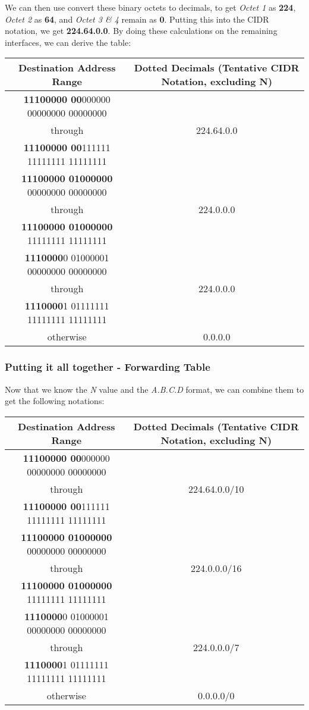 \documentclass[colorlinks=true, allcolors=blue]{article}
\begin{document}
We can then use convert these binary octets to decimals, to get \textit{Octet 1} as \textbf{224}, \textit{Octet 2} as \textbf{64}, and \textit{Octet 3 \& 4} remain as \textbf{0}. Putting this into the CIDR notation, we get \textbf{224.64.0.0}. By doing these calculations on the remaining interfaces, we can derive the table:

\renewcommand{\arraystretch}{1.5}
\begin{center}
\begin{tabular}{|c|c|}
\hline
\textbf{Destination Address Range} & \textbf{Dotted Decimals (Tentative CIDR Notation, excluding N)} \\
\hline
\textbf{11100000 00}000000 00000000 00000000 & \\
through & 224.64.0.0 \\
\textbf{11100000 00}111111 11111111 11111111 & \\
\hline
\textbf{11100000 01000000} 00000000 00000000 & \\
through & 224.0.0.0 \\
\textbf{11100000 01000000} 11111111 11111111 & \\
\hline
\textbf{1110000}0 01000001 00000000 00000000 & \\
through & 224.0.0.0 \\
\textbf{1110000}1 01111111 11111111 11111111 & \\
\hline
otherwise & 0.0.0.0 \\
\hline  
\end{tabular}
\end{center}

\subsubsection{Putting it all together - Forwarding Table}

Now that we know the \textit{N} value and the \textit{A.B.C.D} format, we can combine them to get the following notations:

\renewcommand{\arraystretch}{1.5}
\begin{center}
\begin{tabular}{|c|c|}
\hline
\textbf{Destination Address Range} & \textbf{Dotted Decimals (Tentative CIDR Notation, excluding N)} \\
\hline
\textbf{11100000 00}000000 00000000 00000000 & \\
through & 224.64.0.0/10 \\
\textbf{11100000 00}111111 11111111 11111111 & \\
\hline
\textbf{11100000 01000000} 00000000 00000000 & \\
through & 224.0.0.0/16 \\
\textbf{11100000 01000000} 11111111 11111111 & \\
\hline
\textbf{1110000}0 01000001 00000000 00000000 & \\
through & 224.0.0.0/7 \\
\textbf{1110000}1 01111111 11111111 11111111 & \\
\hline
otherwise & 0.0.0.0/0 \\
\hline  
\end{tabular}
\end{center}
\end{document}
